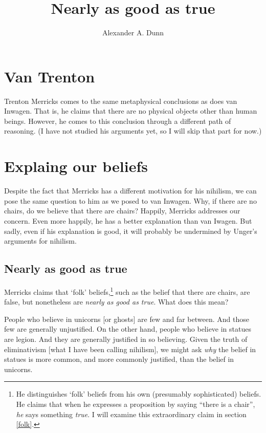 \documentclass[11pt]{standalone} \newif\ifstandlone \standalonetrue
\title{Nearly as good as true}
\author{Alexander A. Dunn}
\newenvironment{squote}{%
\begin{spacing}{1}
       	\begin{list}{}{%
\setlength{\labelwidth}{0pt}%
\rightmargin\leftmargin%
}
\item\relax
}{%
\end{list}%
\end{spacing}
}
\begin{document}
\ifstandalone
\maketitle
\begin{spacing}{1.25}
\fi

\section{Van Trenton}
\label{merricks}
Trenton Merricks comes to the same metaphysical conclusions as does
van Inwagen.  That is, he claims that there are no physical objects
other than human beings.  However, he comes to this conclusion through
a different path of reasoning.  (I have not studied his arguments yet,
so I will skip that part for now.)

\section{Explaing our beliefs}
\label{m-exp}
Despite the fact that Merricks has a different motivation for his
nihilism, we can pose the same question to him as we posed to van
Inwagen.  Why, if there are no chairs, do we believe that there are
chairs?  Happily, Merricks addresses our concern.  Even more happily,
he has a better explanation than van Iwagen.  But sadly, even if his
explanation is good, it will probably be undermined by Unger's
arguments for nihilism.

\subsection{Nearly as good as true}
\label{near}
Merricks claims that `folk' beliefs,\footnote{He distinguishes `folk'
  beliefs from his own (presumably sophisticated) beliefs.  He claims
  that when he expresses a proposition by saying ``there is a chair'',
  {\em he} says something {\em true}.  I will examine this
  extraordinary claim in section \ref{folk}.} such as the belief that
there are chairs, are false, but nonetheless are {\em nearly as good
  as true}.  What does this mean?

\begin{squote}
People who believe in unicorns [or ghosts] are few and far between.
And those few are generally unjustified.  On the other hand, people
who believe in statues are legion.  And they are generally justified
in so believing.  Given the truth of eliminativism [what I have been
  calling nihilism], we might ask {\em why} the belief in statues is
more common, and more commonly justified, than the belief in unicorns.


\end{squote}
\end{spacing}
\end{document}
